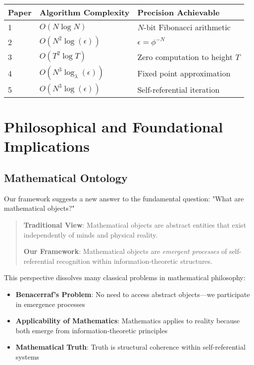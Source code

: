 \documentclass[12pt]{article}
\theoremstyle{plain}
\theoremstyle{definition}
\begin{document}
\begin{center}
\renewcommand{\arraystretch}{1.5}
\begin{tabular}{|l|l|l|}
\hline
\textbf{Paper} & \textbf{Algorithm Complexity} & \textbf{Precision Achievable} \\
\hline
1 & $O(N \log N)$ & $N$-bit Fibonacci arithmetic \\
2 & $O(N^2 \log(\epsilon))$ & $\epsilon = \phi^{-N}$ \\
3 & $O(T^2 \log T)$ & Zero computation to height $T$ \\
4 & $O(N^3 \log_\lambda(\epsilon))$ & Fixed point approximation \\
5 & $O(N^3 \log(\epsilon))$ & Self-referential iteration \\
\hline
\end{tabular}
\end{center}

\section{Philosophical and Foundational Implications}

\subsection{Mathematical Ontology}

Our framework suggests a new answer to the fundamental question: "What are mathematical objects?"

\begin{quote}
\textbf{Traditional View}: Mathematical objects are abstract entities that exist independently of minds and physical reality.

\textbf{Our Framework}: Mathematical objects are \emph{emergent processes} of self-referential recognition within information-theoretic structures.
\end{quote}

This perspective dissolves many classical problems in mathematical philosophy:

\begin{itemize}
\item \textbf{Benacerraf's Problem}: No need to access abstract objects—we participate in emergence processes
\item \textbf{Applicability of Mathematics}: Mathematics applies to reality because both emerge from information-theoretic principles
\item \textbf{Mathematical Truth}: Truth is structural coherence within self-referential systems
\end{itemize}
\end{document}
